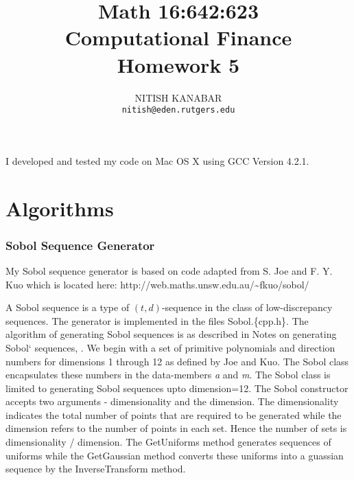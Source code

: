 \documentclass[letterpaper,twoside,11pt,fleqn]{article}
\begin{document}

\title{Math 16:642:623 \\Computational Finance \\ Homework 5}
\author{NITISH KANABAR \\ \texttt{nitish@eden.rutgers.edu}}

\maketitle

\thispagestyle{empty} 

\clearpage
\vfill
\pagebreak


\setcounter{page}{1}


I developed and tested my code on Mac OS X using GCC Version 4.2.1.

\section*{Algorithms}

\subsubsection*{Sobol Sequence Generator}
My Sobol sequence generator is based on code adapted from S. Joe and F. Y. Kuo which is located here: http://web.maths.unsw.edu.au/\textasciitilde{}fkuo/sobol/

A Sobol sequence is a type of \( (t, d) \)-sequence in the class of low-discrepancy sequences.  The generator is implemented in the files Sobol.\{cpp.h\}.  The algorithm of generating Sobol sequences is as described in Notes on generating Sobol` sequences, \cite{joe_kuo}.  We begin with a set of primitive polynomials and direction numbers for dimensions 1 through 12 as defined by Joe and Kuo. The Sobol class encapsulates these numbers in the data-members {\em a} and {\em m}.  The Sobol class is limited to generating Sobol sequences upto dimension=12.  The Sobol constructor accepts two arguments - dimensionality and the dimension. The dimensionality indicates the total number of points that are required to be generated while the dimension refers to the number of points in each set. Hence the number of sets is dimensionality / dimension.   The GetUniforms method generates sequences of uniforms while the GetGaussian method converts these uniforms into a guassian sequence by the InverseTransform method.
\end{document}
